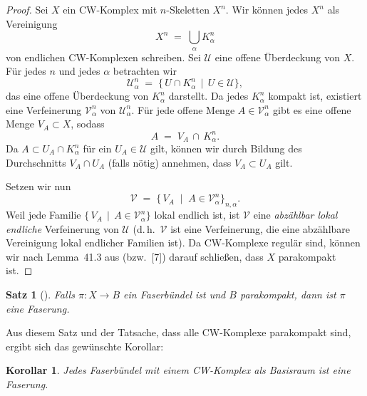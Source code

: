 \documentclass[12pt, hidelinks]{article}
\numberwithin{conj}{section}
\newtheorem{theorem}[conj]{Satz}
\newtheorem{corollary}[conj]{Korollar}
\begin{document}
                \begin{proof}
                    Sei $X$ ein CW-Komplex mit $n$-Skeletten $X^n$. Wir können jedes $X^n$ als Vereinigung 
                    \[
                        X^n \;=\; \bigcup_{\alpha} K^n_{\alpha}
                    \]
                    von endlichen CW-Komplexen schreiben. Sei $\mathcal{U}$ eine offene Überdeckung von $X$. Für jedes $n$ und jedes $\alpha$ betrachten wir
                    \[
                        \mathcal{U}^n_\alpha \;=\; \{\,U \cap K^n_{\alpha} \,\mid\, U \in \mathcal{U}\},
                    \]
                    das eine offene Überdeckung von $K^n_{\alpha}$ darstellt. Da jedes $K^n_{\alpha}$ kompakt ist, existiert eine Verfeinerung $\mathcal{V}^n_\alpha$ von $\mathcal{U}^n_\alpha$. Für jede offene Menge $A \in \mathcal{V}^n_\alpha$ gibt es eine offene Menge $V_A \subset X$, sodass
                    \[
                        A \;=\; V_A \,\cap\, K^n_{\alpha}.
                    \]
                    Da $A \subset U_A \cap K^n_{\alpha}$ für ein $U_A \in \mathcal{U}$ gilt, können wir durch Bildung des Durchschnitts $V_A \cap U_A$ (falls nötig) annehmen, dass $V_A \subset U_A$ gilt.
                    
                    Setzen wir nun
                    \[
                        \mathcal{V} \;=\; \bigl\{\,V_A \;\mid\; A \in \mathcal{V}^n_{\alpha}\bigr\}_{n,\alpha}.
                    \]
                    Weil jede Familie $\{\,V_A \,\mid\, A \in \mathcal{V}^n_{\alpha}\}$ lokal endlich ist, ist $\mathcal{V}$ eine \emph{abzählbar lokal endliche} Verfeinerung von $\mathcal{U}$ (d.\,h.\ $\mathcal{V}$ ist eine Verfeinerung, die eine abzählbare Vereinigung lokal endlicher Familien ist). Da CW-Komplexe regulär sind, können wir nach Lemma~41.3 aus \cite{hatcher2001} (bzw.\ [7]) darauf schließen, dass $X$ parakompakt ist.
                \end{proof}
                
                \begin{theorem}[{\cite[Theorem 1]{huebsch1955}}]
                    Falls \(\pi : X \to B\) ein Faserbündel ist und \(B\) parakompakt, dann ist \(\pi\) eine Faserung.
                \end{theorem}
                
                \noindent
                Aus diesem Satz und der Tatsache, dass alle CW-Komplexe parakompakt sind, ergibt sich das gewünschte Korollar:
                
                \begin{corollary}
                    Jedes Faserbündel mit einem CW-Komplex als Basisraum ist eine Faserung.
                \end{corollary}
                
\end{document}
